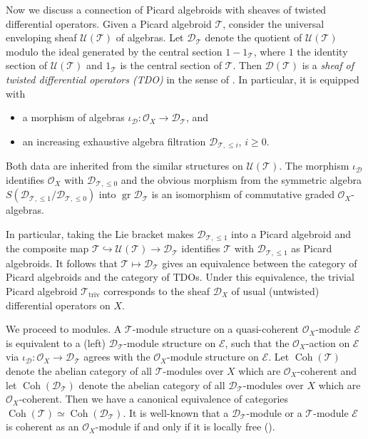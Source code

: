 \documentclass[12pt]{amsart}
\newcommand{\TT}{\mathscr{T}}
\newcommand{\OO}{\mathcal{O}}
\newcommand{\EE}{\mathcal{E}}
\newcommand{\coh}{\operatorname{Coh}}
\theoremstyle{definition}
\numberwithin{equation}{section}
\begin{document}
Now we discuss a connection of Picard algebroids with sheaves of twisted differential operators.
Given a Picard algebroid $\TT$,
consider the universal enveloping sheaf $\mathscr{U}(\TT)$ of algebras.
Let $\mathscr{D}_\TT$ denote the quotient of $\mathscr{U}(\TT)$ modulo the ideal generated by the central section $1 - 1_\TT$, where $1$ the  identity section of $\mathscr{U}(\TT)$ and $1_\TT$ is the central section of $\TT$. Then $\mathscr{D}(\TT)$ is a {\it sheaf  of twisted differential operators (TDO)} in the sense of \cite[Definition 2.1.1]{BB}. In particular, it is equipped with
\begin{itemize}
	\item
	a morphism of algebras $\iota_{\mathscr{D}}: \OO_X \to \mathscr{D}_{\TT}$, and
	\item
	an increasing exhaustive algebra filtration $\mathscr{D}_{\TT, \leqslant i}$, $i \geqslant0$.
\end{itemize}
Both data are inherited from the similar structures on $\mathscr{U}(\TT)$. The morphism $\iota_{\mathscr{D}}$ identifies $\OO_X$ with $\mathscr{D}_{\TT, \leqslant 0}$ and the obvious morphism from the symmetric algebra $S(\mathscr{D}_{\TT, \leqslant 1} / \mathscr{D}_{\TT, \leqslant 0})$ into $\operatorname{gr} \mathscr{D}_{\TT}$ is an isomorphism of  commutative graded $\OO_X$-algebras.

In particular, taking the Lie bracket makes $\mathscr{D}_{\TT, \leqslant 1}$ into a Picard algebroid and the composite map $\TT \hookrightarrow \mathscr{U}(\TT) \to \mathscr{D}_{\TT}$ identifies $\TT$ with $\mathscr{D}_{\TT, \leqslant 1}$ as Picard algebroids. It follows that $\TT \mapsto \mathscr{D}_\TT$ gives an equivalence between the category of Picard algebroids and the category of TDOs. Under this equivalence, the trivial Picard algebroid $\TT_{\operatorname{triv}}$ corresponds to the sheaf $\mathscr{D}_X$ of usual (untwisted) differential operators on $X$.

We proceed to modules.
A $\TT$-module structure on a quasi-coherent $\OO_X$-module $\EE$ is equivalent to a (left) $\mathscr{D}_\TT$-module structure on $\EE$, such that the $\OO_X$-action on $\EE$ via $\iota_{\mathscr{D}}: \OO_X \to \mathscr{D}_{\TT}$ agrees with the $\OO_X$-module structure on $\EE$. Let $\coh(\TT)$ denote the abelian category of all $\TT$-modules over $X$ which are $\OO_X$-coherent and let $\coh(\mathscr{D}_\TT)$ denote the abelian category of all $\mathscr{D}_\TT$-modules over $X$ which are $\OO_X$-coherent. Then we have a canonical equivalence of categories $\coh(\TT) \simeq \coh(\mathscr{D}_\TT)$. It is well-known that a $\mathscr{D}_\TT$-module or a $\TT$-module $\EE$ is coherent as an $\OO_X$-module if and only if it is locally free (\cite[Lemma 2.3.1 (i)]{BB}).  
\end{document}
